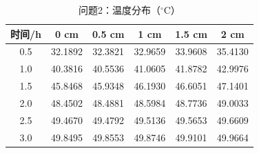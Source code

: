 \begin{table}[H]\centering
\caption{问题2：温度分布（$^\circ$C）}\label{tab:q2T}
\begin{tabular}{cccccc}\toprule
时间/h & 0 cm & 0.5 cm & 1 cm & 1.5 cm & 2 cm\\ \midrule
0.5 & 32.1892 & 32.3821 & 32.9659 & 33.9608 & 35.4130\\
1.0 & 40.3816 & 40.5536 & 41.0605 & 41.8782 & 42.9976\\
1.5 & 45.8468 & 45.9348 & 46.1930 & 46.6051 & 47.1401\\
2.0 & 48.4502 & 48.4881 & 48.5984 & 48.7736 & 49.0033\\
2.5 & 49.4670 & 49.4792 & 49.5136 & 49.5653 & 49.6609\\
3.0 & 49.8495 & 49.8553 & 49.8746 & 49.9101 & 49.9664\\
\bottomrule\end{tabular}\end{table}

